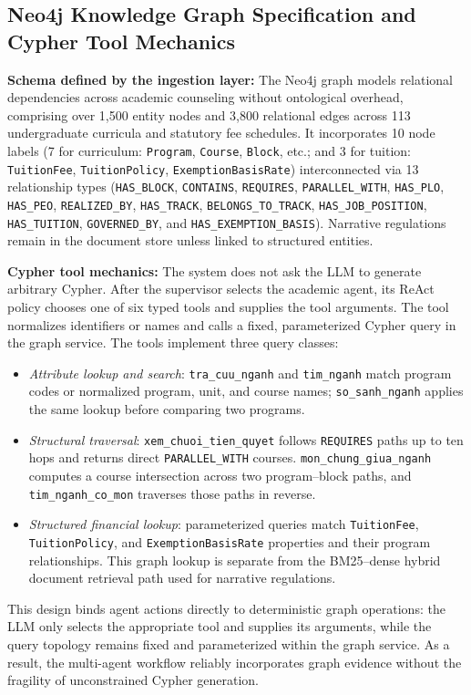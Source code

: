 \subsection{Neo4j Knowledge Graph Specification and Cypher Tool Mechanics}
\label{sec:neo4j_graph}

\textbf{Schema defined by the ingestion layer:}
The Neo4j graph models relational dependencies across academic counseling without ontological overhead, comprising over 1,500 entity nodes and 3,800 relational edges across 113 undergraduate curricula and statutory fee schedules. It incorporates 10 node labels (7 for curriculum: \texttt{Program}, \texttt{Course}, \texttt{Block}, etc.; and 3 for tuition: \texttt{TuitionFee}, \texttt{TuitionPolicy}, \texttt{ExemptionBasisRate}) interconnected via 13 relationship types (\texttt{HAS\_BLOCK}, \texttt{CONTAINS}, \texttt{REQUIRES}, \texttt{PARALLEL\_WITH}, \texttt{HAS\_PLO}, \texttt{HAS\_PEO}, \texttt{REALIZED\_BY}, \texttt{HAS\_TRACK}, \texttt{BELONGS\_TO\_TRACK}, \texttt{HAS\_JOB\_POSITION}, \texttt{HAS\_TUITION}, \texttt{GOVERNED\_BY}, and \texttt{HAS\_EXEMPTION\_BASIS}). Narrative regulations remain in the document store unless linked to structured entities.

\textbf{Cypher tool mechanics:}
The system does not ask the LLM to generate arbitrary Cypher. After the supervisor selects the academic agent, its ReAct policy chooses one of six typed tools and supplies the tool arguments. The tool normalizes identifiers or names and calls a fixed, parameterized Cypher query in the graph service. The tools implement three query classes:
\begin{itemize}
    \item \emph{Attribute lookup and search}: \texttt{tra\_cuu\_nganh} and \texttt{tim\_nganh} match program codes or normalized program, unit, and course names; \texttt{so\_sanh\_nganh} applies the same lookup before comparing two programs.
    \item \emph{Structural traversal}: \texttt{xem\_chuoi\_tien\_quyet} follows \texttt{REQUIRES} paths up to ten hops and returns direct \texttt{PARALLEL\_WITH} courses. \texttt{mon\_chung\_giua\_nganh} computes a course intersection across two program--block paths, and \texttt{tim\_nganh\_co\_mon} traverses those paths in reverse.
    \item \emph{Structured financial lookup}: parameterized queries match \texttt{TuitionFee}, \texttt{TuitionPolicy}, and \texttt{ExemptionBasisRate} properties and their program relationships. This graph lookup is separate from the BM25--dense hybrid document retrieval path used for narrative regulations.
\end{itemize}
This design binds agent actions directly to deterministic graph operations: the LLM only selects the appropriate tool and supplies its arguments, while the query topology remains fixed and parameterized within the graph service. As a result, the multi-agent workflow reliably incorporates graph evidence without the fragility of unconstrained Cypher generation.

